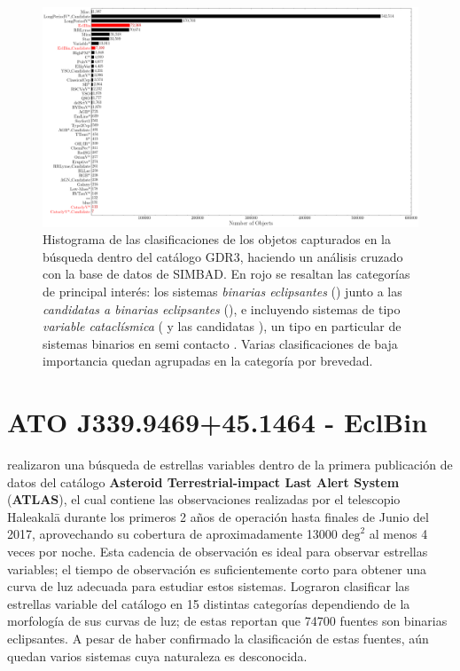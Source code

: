 \begin{figure}[!ht]
	\centering
	\includegraphics[scale=0.32]{Muestra/Secciones/Figures/Figura Gaia SIMBAD Busqueda Resultados.png}
	\caption{Histograma de las clasificaciones de los objetos capturados en la
	búsqueda dentro del catálogo GDR3, haciendo un análisis cruzado con la base
	de datos de SIMBAD. En rojo se resaltan las categorías de principal interés:
	los sistemas \textit{binarias eclipsantes} () junto a las
	\textit{candidatas a binarias eclipsantes} (), e
	incluyendo sistemas de tipo \textit{variable cataclísmica} (
	y las candidatas ), un tipo en particular de
	sistemas binarios en semi contacto
	. Varias
	clasificaciones de baja importancia quedan agrupadas en la categoría
	 por brevedad.}
	\label{figuraBusquedaSimbadHistograma}
\end{figure}

\section{ATO J339.9469+45.1464 - EclBin}

 realizaron una búsqueda de estrellas
variables dentro de la primera publicación de datos del catálogo
\textbf{Asteroid Terrestrial-impact Last Alert System} (\textbf{ATLAS}), el cual
contiene las observaciones realizadas por el telescopio Haleakalā durante los
primeros 2 años de operación hasta finales de Junio del 2017, aprovechando su
cobertura de aproximadamente \num{13000} $\mathrm{deg}^2$ al menos 4 veces por
noche. Esta cadencia de observación es ideal para observar estrellas variables;
el tiempo de observación es suficientemente corto para obtener una curva de luz
adecuada para estudiar estos sistemas. Lograron clasificar las estrellas
variable del catálogo en 15 distintas categorías dependiendo de la morfología de
sus curvas de luz; de estas reportan que \num{74700} fuentes son binarias
eclipsantes. A pesar de haber confirmado la clasificación de estas fuentes, aún
quedan varios sistemas cuya naturaleza es desconocida.

